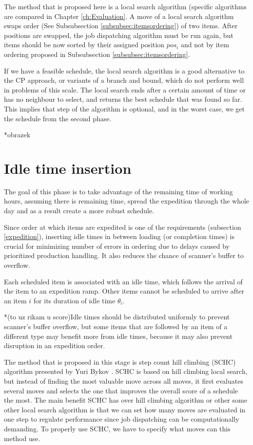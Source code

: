 \documentclass{ctuthesis}
\begin{document}
The method that is proposed here is a local search algorithm (specific algorithms are compared in Chapter \ref{ch:Evaluation}. A move of a local search algorithm swaps order (See Subsubsection \ref{subsubsec:itemsordering}) of two items. After positions are swapped, the job dispatching algorithm must be run again, but items should be now sorted by their assigned position $pos_i$ and not by item ordering proposed in Subsubsection \ref{subsubsec:itemsordering}.

If we have a feasible schedule, the local search algorithm is a good alternative to the CP approach, or variants of a branch and bound, which do not perform well in problems of this scale. The local search ends after a certain amount of time or has no neighbour to select, and returns the best schedule that was found so far. This implies that step of the algorithm is optional, and in the worst case, we get the schedule from the second phase.

*obrazek

\section{Idle time insertion}

The goal of this phase is to take advantage of the remaining time of working hours, assuming there is remaining time, spread the expedition through the whole day and as a result create a more robust schedule. 

Since order at which items are expedited is one of the requirements (subsection \ref{expedition}), inserting idle times in between loading (or completion times) is crucial for minimizing number of errors in ordering due to delays caused by prioritized production handling. It also reduces the chance of scanner's buffer to overflow.

Each scheduled item is associated with an idle time, which follows the arrival of the item to an expedition ramp. Other items cannot be scheduled to arrive after an item $i$ for its duration of idle time $\theta_i$.

*(to uz rikam u score)Idle times should be distributed uniformly to prevent scanner's buffer overflow, but some items that are followed by an item of a different type may benefit more from idle times, because it may also prevent disruption in an expedition order.

The method that is proposed in this stage is step count hill climbing (SCHC) algorithm presented by Yuri Bykov \cite{yuri}. SCHC is based on hill climbing local search, but instead of finding the most valuable move across all moves, it first evaluates several moves and selects the one that improves the overall score of a schedule the most. The main benefit SCHC has over hill climbing algorithm or other some other local search algorithm is that we can set how many moves are evaluated in one step to regulate performance since job dispatching can be computationally demanding. To properly use SCHC, we have to specify what moves can this method use. 
\end{document}
